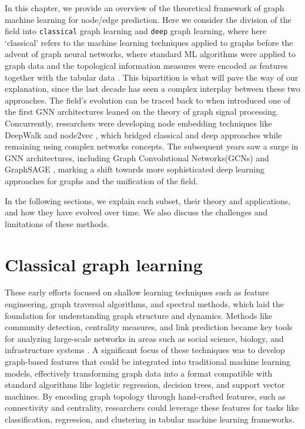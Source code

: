 In this chapter, we provide an overview of the theoretical framework of graph machine learning for node/edge prediction. Here we consider the division of the field into \texttt{classical} graph learning and \texttt{deep} graph learning, where here `classical' refers to the machine learning techniques applied to graphs before the advent of graph neural networks, where standard ML algorithms were applied to graph data and the topological information measures were encoded as features together with the tabular data  \cite{costa2007characterization, silva2016machine}. This bipartition is what will pave the way of our explanation, since the last decade has seen a complex interplay between these two approaches. The field's evolution can be traced back to when  introduced one of the first GNN architectures leaned on the theory of graph signal processing. Concurrently, researchers were developing node embedding techniques like DeepWalk \cite{perozzi2014deepwalk} and node2vec \cite{grover2016node2vec}, which bridged classical and deep approaches while remaining using complex networks concepts. The subsequent years saw a surge in GNN architectures, including Graph Convolutional Networks(GCNs) \cite{kipf2016semi} and GraphSAGE \cite{hamilton2017inductive}, marking a shift towards more sophisticated deep learning approaches for graphs and the unification of the field.  

In the following sections, we explain each subset, their theory and applications, and how they have evolved over time. We also discuss the challenges and limitations of these methods.

\section{Classical graph learning}

These early efforts focused on shallow learning techniques such as feature engineering, graph traversal algorithms, and spectral methods, which laid the foundation for understanding graph structure and dynamics. Methods like community detection, centrality measures, and link prediction \cite{silva2016machine} became key tools for analyzing large-scale networks in areas such as social science, biology, and infrastructure systems \cite{newman2018networks,boccaletti2006complex}. A significant focus of these techniques was to develop graph-based features that could be integrated into traditional machine learning models, effectively transforming graph data into a format compatible with standard algorithms like logistic regression, decision trees, and support vector machines. By encoding graph topology through hand-crafted features, such as connectivity and centrality, researchers could leverage these features for tasks like classification, regression, and clustering in tabular machine learning frameworks.

